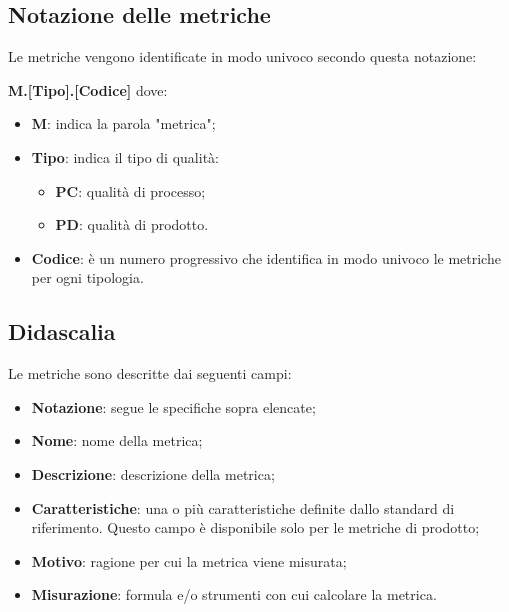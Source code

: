 \subsection{Notazione delle metriche}
\par Le metriche vengono identificate in modo univoco secondo questa notazione: 
\par \textbf{M.[Tipo].[Codice]}
dove: 
\begin{itemize}
    \item \textbf{M}: indica la parola "metrica";
    \item \textbf{Tipo}: indica il tipo di qualità: 
        \begin{itemize}
            \item \textbf{PC}: qualità di processo; 
            \item \textbf{PD}: qualità di prodotto.
        \end{itemize}
    \item \textbf{Codice}: è un numero progressivo che identifica in modo univoco le metriche per ogni tipologia.
\end{itemize}

\subsection{Didascalia}
Le metriche sono descritte dai seguenti campi:
\begin{itemize}
    \item \textbf{Notazione}: segue le specifiche sopra elencate;
    \item \textbf{Nome}: nome della metrica;
    \item \textbf{Descrizione}: descrizione della metrica;
    \item \textbf{Caratteristiche}: una o più caratteristiche definite dallo standard di riferimento. Questo campo è disponibile solo per le metriche di prodotto;
    \item \textbf{Motivo}: ragione per cui la metrica viene misurata;
    \item \textbf{Misurazione}: formula e/o strumenti con cui calcolare la metrica.
\end{itemize}

